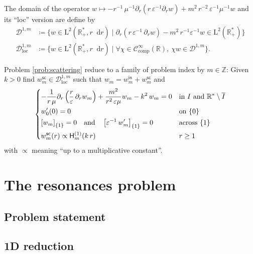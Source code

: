 \documentclass[12pt,a4paper]{article}
\newcommand{\bbR}{\mathbb{R}}
\newcommand{\bbZ}{\mathbb{Z}}
\newcommand{\calD}{\mathcal{D}}
\newcommand{\scrC}{\mathscr{C}}
\newcommand{\rmL}{\mathrm{L}}
\newcommand{\Hu}{\mathop{}\!\mathsf{H}^{(1)}}
\newcommand{\di}[1]{\mathop{}\!\mathrm{d}#1}
\newcommand{\plr}[1]{\left(#1\right)}
\newcommand{\clr}[1]{\left[#1\right]}
\newcommand{\eps}{\varepsilon}
\newcommand{\comp}{\mathrm{comp}}
\newcommand{\loc}{\mathrm{loc}}
\newcommand{\inc}{\mathsf{in}}
\newcommand{\sca}{\mathsf{sc}}
\begin{document}
The domain of the operator $w \mapsto -r^{-1}\, \mu^{-1} \partial_r(r\, \eps^{-1} \partial_r w) + m^2\, r^{-2}\, \eps^{-1}\mu^{-1} w$ and its ``loc'' version are define by
\begin{align*}
    \calD^{1, m} &\coloneqq \{w \in \rmL^2(\bbR_+^*, r\di{r}) \mid \partial_r(r\, \eps^{-1}\, \partial_r w) - m^2\, r^{-1}\eps^{-1} w \in \rmL^2(\bbR_+^*)\}\\
    \calD^{1, m}_\loc &\coloneqq \{w \in \rmL^2(\bbR_+^*, r\di{r}) \mid \forall \chi \in \scrC_\comp^\infty(\bbR),\ \chi w \in \calD^{1, m}\}.
\end{align*}

Problem \ref{prob:scattering} reduce to a family of problem index by $m \in \bbZ$: Given $k > 0$ find $w_m^\sca \in \calD^{1, m}_\loc$ such that $w_m = w_m^\inc + w_m^\sca$ and
\begin{equation}\label{prob:w_scattering}
     \begin{dcases}
        -\frac{1}{r\, \mu} \partial_r\plr{\frac{r}{\eps}\, \partial_r w_m} + \dfrac{m^2}{r^2\, \eps\mu} w_m - k^2\, w_m = 0 & \text{in } I \text{ and } \bbR^* \setminus \overline{I}      \\
        w_0'(0) = 0 & \text{on } \{0\}       \\
        \clr{w_m}_{\{1\}} = 0 \quad\text{and}\quad \clr{\eps^{-1}\, w_m'}_{\{1\}} = 0              & \text{across } \{1\}   \\
        w_m^\sca(r) \propto \Hu_m(k\, r)                                                              & r \ge 1
    \end{dcases}
\end{equation}
with $\propto$ meaning ``up to a multiplicative constant''.

\section{The resonances problem}

\subsection{Problem statement}

\subsection{1D reduction}
\end{document}
